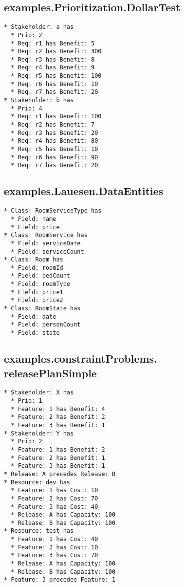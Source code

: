 \documentclass[a4paper,oneside]{article}
\begin{document}
\begin{multicols*}{4}
\begin{lstlisting}
\end{lstlisting}


\subsection*{examples.Prioritization.DollarTest}
\begin{lstlisting}
* Stakeholder: a has
  * Prio: 2
  * Req: r1 has Benefit: 5
  * Req: r2 has Benefit: 300
  * Req: r3 has Benefit: 8
  * Req: r4 has Benefit: 9
  * Req: r5 has Benefit: 100
  * Req: r6 has Benefit: 10
  * Req: r7 has Benefit: 20
* Stakeholder: b has
  * Prio: 4
  * Req: r1 has Benefit: 100
  * Req: r2 has Benefit: 7
  * Req: r3 has Benefit: 20
  * Req: r4 has Benefit: 80
  * Req: r5 has Benefit: 10
  * Req: r6 has Benefit: 90
  * Req: r7 has Benefit: 20

\end{lstlisting}


\vfill\null\columnbreak
\subsection*{examples.Lauesen.DataEntities}
\begin{lstlisting}
* Class: RoomServiceType has
  * Field: name
  * Field: price
* Class: RoomService has
  * Field: serviceDate
  * Field: serviceCount
* Class: Room has
  * Field: roomId
  * Field: bedCount
  * Field: roomType
  * Field: price1
  * Field: price2
* Class: RoomState has
  * Field: date
  * Field: personCount
  * Field: state

\end{lstlisting}

 
\subsection*{examples.constraintProblems.\\releasePlanSimple}
\begin{lstlisting}
* Stakeholder: X has
  * Prio: 1
  * Feature: 1 has Benefit: 4
  * Feature: 2 has Benefit: 2
  * Feature: 3 has Benefit: 1
* Stakeholder: Y has
  * Prio: 2
  * Feature: 1 has Benefit: 2
  * Feature: 2 has Benefit: 1
  * Feature: 3 has Benefit: 1
* Release: A precedes Release: B
* Resource: dev has
  * Feature: 1 has Cost: 10
  * Feature: 2 has Cost: 70
  * Feature: 3 has Cost: 40
  * Release: A has Capacity: 100
  * Release: B has Capacity: 100
* Resource: test has
  * Feature: 1 has Cost: 40
  * Feature: 2 has Cost: 10
  * Feature: 3 has Cost: 70
  * Release: A has Capacity: 100
  * Release: B has Capacity: 100
* Feature: 3 precedes Feature: 1

\end{lstlisting}

 
\end{multicols*}
\end{document}

